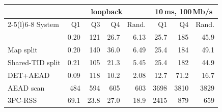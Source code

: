 \begin{tabular}{@{}lrrrrrrr@{}}
\toprule
 & \multicolumn{4}{c}{loopback} & \multicolumn{3}{c}{10\,ms, 100\,Mb/s}\\
\cmidrule(lr){2-5}\cmidrule(l){6-8}
System & Q1 & Q3 & Q4 & Rand. & Q1 & Q4 & Rand.\\
\midrule
\textbf{\sys{}} & 0.20 & 121 & 26.7 & 6.13 & 25.7 & 185 & 45.9\\
Map split & 0.20 & 140 & 36.0 & 6.49 & 25.4 & 184 & 49.1\\
Shared-TID split & 0.21 & 105 & 21.3 & 5.45 & 25.4 & 182 & 44.9\\
DET+AEAD & 0.09 & 118 & 10.2 & 2.08 & 12.7 & 71.2 & 16.7\\
AEAD scan & 484 & 594 & 605 & 603 & 3698 & 3810 & 3829\\
3PC-RSS & 69.1 & 23.8 & 27.0 & 18.9 & 2415 & 879 & 659\\
\bottomrule
\end{tabular}
